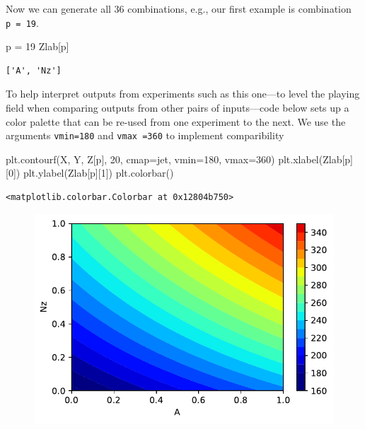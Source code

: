 \documentclass[
  letterpaper,
  DIV=11,
  numbers=noendperiod]{scrreprt}
\newenvironment{Shaded}{\begin{snugshade}}{\end{snugshade}}
\newcommand{\DecValTok}[1]{\textcolor[rgb]{0.68,0.00,0.00}{#1}}
\newcommand{\NormalTok}[1]{\textcolor[rgb]{0.00,0.23,0.31}{#1}}
\newcommand{\OperatorTok}[1]{\textcolor[rgb]{0.37,0.37,0.37}{#1}}
\newcommand{\StringTok}[1]{\textcolor[rgb]{0.13,0.47,0.30}{#1}}
\begin{document}
Now we can generate all 36 combinations, e.g., our first example is
combination \texttt{p\ =\ 19}.

\begin{Shaded}
\begin{Highlighting}[]
\NormalTok{p }\OperatorTok{=} \DecValTok{19}
\NormalTok{Zlab[p]}
\end{Highlighting}
\end{Shaded}

\begin{verbatim}
['A', 'Nz']
\end{verbatim}

To help interpret outputs from experiments such as this one---to level
the playing field when comparing outputs from other pairs of
inputs---code below sets up a color palette that can be re-used from one
experiment to the next. We use the arguments \texttt{vmin=180} and
\texttt{vmax\ =360} to implement comparibility

\begin{Shaded}
\begin{Highlighting}[]
\NormalTok{plt.contourf(X, Y, Z[p], }\DecValTok{20}\NormalTok{, cmap}\OperatorTok{=}\StringTok{\textquotesingle{}jet\textquotesingle{}}\NormalTok{, vmin}\OperatorTok{=}\DecValTok{180}\NormalTok{, vmax}\OperatorTok{=}\DecValTok{360}\NormalTok{)}
\NormalTok{plt.xlabel(Zlab[p][}\DecValTok{0}\NormalTok{])}
\NormalTok{plt.ylabel(Zlab[p][}\DecValTok{1}\NormalTok{])}
\NormalTok{plt.colorbar()}
\end{Highlighting}
\end{Shaded}

\begin{verbatim}
<matplotlib.colorbar.Colorbar at 0x12804b750>
\end{verbatim}

\begin{figure}[H]

{\centering \includegraphics{002_awwe_files/figure-pdf/cell-11-output-2.pdf}

}

\end{figure}
\end{document}

